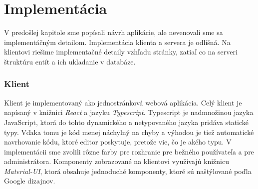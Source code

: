 \chapter{Implementácia}
V predošlej kapitole sme popísali návrh aplikácie, ale nevenovali sme sa implementáčným detailom.
Implementácia klienta a servera je odlišná. Na klientovi riešime implementačné detaily vzhľadu
stránky, zatiaľ co na serveri štruktúru entít a ich ukladanie v databáze.

\subsection{Klient}
Klient je implementovaný ako jednostránková webová aplikácia. Celý klient je napísaný v knižnici
\textit{React} a jazyku \textit{Typescript}. Typescript je nadmnožinou jazyka JavaScript, ktorá do
tohto dynamického a netypovaného jazyka pridáva statické typy. Vďaka tomu je kód menej náchylný na
chyby a výhodou je tiež automatické navrhovanie kódu, ktoré editor poskytuje, pretože vie, čo je
akého typu. V implementácii sme zvolili rôzne farby pre rozhranie pre bežného používateľa a pre
administrátora. Komponenty zobrazované na klientovi využívajú knižnicu \textit{Material-UI}, ktorá
obsahuje jednoduché komponenty, ktoré sú naštýlované poďla Google dizajnov.

